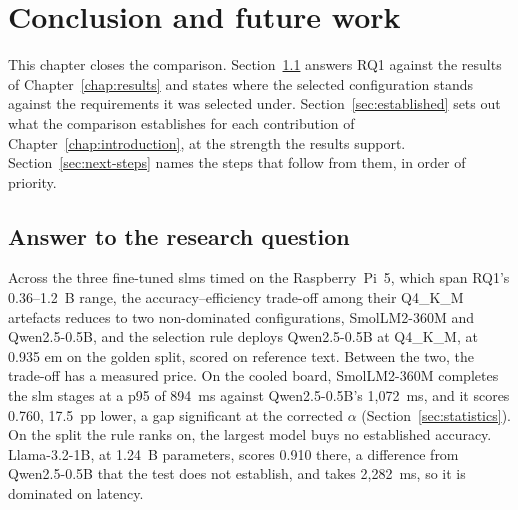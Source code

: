\chapter{Conclusion and future work}
\label{chap:conclusion}

This chapter closes the comparison. Section~\ref{sec:rq1-answer} answers RQ1 against the results
of Chapter~\ref{chap:results} and states where the selected configuration stands against the
requirements it was selected under. Section~\ref{sec:established} sets out what the comparison
establishes for each contribution of Chapter~\ref{chap:introduction}, at the strength the results
support. Section~\ref{sec:next-steps} names the steps that follow from them, in order of priority.


\section{Answer to the research question}
\label{sec:rq1-answer}

Across the three fine-tuned \glspl{slm} timed on the Raspberry~Pi~5, which span RQ1's
0.36--1.2~B range, the accuracy--efficiency trade-off among their Q4\_K\_M artefacts reduces to two
non-dominated configurations, SmolLM2-360M and Qwen2.5-0.5B, and the selection rule deploys
Qwen2.5-0.5B at Q4\_K\_M, at 0.935 \gls{em} on the golden split, scored on reference text. Between
the two, the trade-off has a measured price. On the cooled board, SmolLM2-360M
completes the \gls{slm} stages at a p95 of 894~ms against Qwen2.5-0.5B's 1{,}072~ms, and it scores
0.760, 17.5~pp lower, a gap significant at the corrected $\alpha$ (Section~\ref{sec:statistics}).
On the split the rule ranks on, the largest model buys no established accuracy. Llama-3.2-1B, at
1.24~B parameters, scores 0.910 there, a difference from Qwen2.5-0.5B that the test does not
establish, and takes 2{,}282~ms, so it is dominated on latency.


